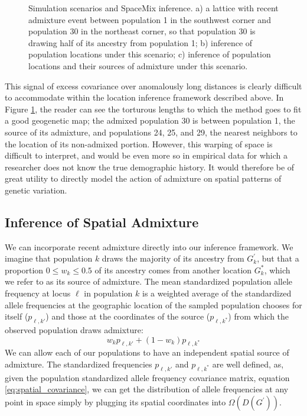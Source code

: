 \documentclass[12pt]{article}
\newcommand{\kadmixsource}[1]{{$G^{*}_{#1}$}}
\newcommand{\identifyadmixsource}[1]{{#1^{*}}}
\begin{document}
\begin{figure}
	\caption{Simulation scenarios and SpaceMix inference.  a) a lattice with recent admixture event between population 1 in the southwest corner and population 30 in the northeast corner, so that population 30 is drawing half of its ancestry from population 1; b) inference of population locations under this scenario; c) inference of population locations and their sources of admixture under this scenario.}\label{sfig:corner_admix_scenarios}
\end{figure}

This signal of excess covariance over anomalously long distances is clearly difficult to accommodate within the location inference framework described above.  In Figure \ref{sfig:corner_admix_scenarios}, the reader can see the torturous lengths to which the method goes to fit a good geogenetic map; the admixed population 30 is between population 1, the source of its admixture, and populations 24, 25, and 29, the nearest neighbors to the location of its non-admixed portion.  However, this warping of space is difficult to interpret, and would be even more so in empirical data for which a researcher does not know the true demographic history.  It would therefore be of great utility to directly model the action of admixture on spatial patterns of genetic variation.


\subsection*{Inference of Spatial Admixture}
We can incorporate recent admixture directly into our inference framework.  We imagine that population $k$ draws the majority of its ancestry from $G^{\prime}_{k}$, but that a proportion $0 \leq w_k \leq 0.5$ of its ancestry comes from another location \kadmixsource{k}, which we refer to as its source of admixture. The mean standardized population allele frequency at locus $\ell$ in population $k$ is a weighted average of the standardized allele frequencies at the geographic location of the sampled population chooses for itself ($p_{\ell,k'}$) and those at the coordinates of the source ($p_{\ell,\identifyadmixsource{k}}$) from which the observed population draws admixture:
\begin{equation}
w_k p_{\ell,k'} + (1-w_k) p_{\ell,\identifyadmixsource{k}} \label{eqn-admixedfreq}
\end{equation}
We can allow each of our populations to have an independent spatial source of admixture. The standardized frequencies $p_{\ell,k'}$ and $p_{\ell,\identifyadmixsource{k}} $ are well defined, as, given the population standardized allele frequency covariance matrix, equation \ref{eq:spatial_covariance}, we can get the distribution of allele frequencies at any point in space simply by plugging its spatial coordinates into $\Omega(D(G^{\prime}))$.
\end{document}
